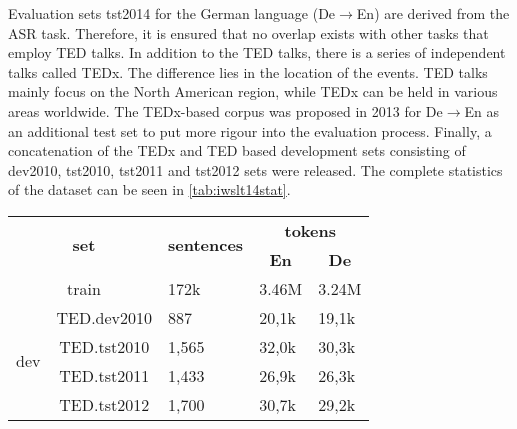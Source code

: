 Evaluation sets tst2014 for the German language (De$\rightarrow$En) are derived from the ASR task. Therefore, it is ensured that no overlap exists with other tasks that employ TED talks. In addition to the TED talks, there is a series of independent talks called TEDx. The difference lies in the location of the events. TED talks mainly focus on the North American region, while TEDx can be held in various areas worldwide. The TEDx-based corpus was proposed in 2013 for De$\rightarrow$En as an additional test set to put more rigour into the evaluation process. Finally, a concatenation of the TEDx and TED based development sets consisting of dev2010, tst2010, tst2011 and tst2012 sets were released. The complete statistics of the dataset can be seen in \cref{tab:iwslt14stat}.

\begin{table}[h]
    \centering
    \begin{tabular}{@{}cclll@{}}
        \toprule
        \multicolumn{2}{c}{\multirow{2}{*}{\textbf{set}}} & \multicolumn{1}{c}{\multirow{2}{*}{\textbf{sentences}}} & \multicolumn{2}{c}{\textbf{tokens}}                                           \\ %
        \multicolumn{2}{c}{}                              & \multicolumn{1}{c}{}                                    & \multicolumn{1}{c}{\textbf{En}}     & \multicolumn{1}{c}{\textbf{De}}         \\ \toprule
        \multicolumn{2}{c}{train}                         & 172k                                                    & 3.46M                               & 3.24M                                   \\ \midrule
        \multirow{4}{*}{dev}                              & TED.dev2010                                             & 887                                 & 20,1k                           & 19,1k \\
                                                          & TED.tst2010                                             & 1,565                               & 32,0k                           & 30,3k \\
                                                          & TED.tst2011                                             & 1,433                               & 26,9k                           & 26,3k \\
                                                          & TED.tst2012                                             & 1,700                               & 30,7k                           & 29,2k \\ \midrule

\end{tabular}
\end{table}
